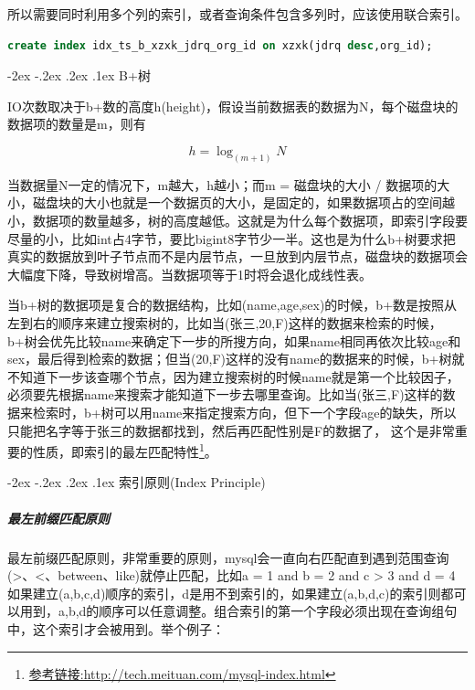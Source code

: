 \documentclass[12pt]{book}
\makeatletter
\numberwithin{dummy}{section}
\theoremstyle{ocrenumbox}
\theoremstyle{blacknumex}
\theoremstyle{blacknumbox}
\theoremstyle{ocrenum}
\renewcommand\paragraph{\@startsection{paragraph}{4}{\z@}
	{-2ex \@plus-.2ex \@minus .2ex}
	{.1ex}
	{\normalfont\small\sffamily\bfseries}}
\makeatother
\begin{document}
所以需要同时利用多个列的索引，或者查询条件包含多列时，应该使用联合索引。

\begin{lstlisting}[language=SQL]
create index idx_ts_b_xzxk_jdrq_org_id on xzxk(jdrq desc,org_id);
\end{lstlisting}

\paragraph{B+树}

IO次数取决于b+数的高度h(height)，假设当前数据表的数据为N，每个磁盘块的数据项的数量是m，则有

\begin{equation}
h=\log_{(m+1)} N
\end{equation}


当数据量N一定的情况下，m越大，h越小；而m = 磁盘块的大小 / 数据项的大小，磁盘块的大小也就是一个数据页的大小，是固定的，如果数据项占的空间越小，数据项的数量越多，树的高度越低。这就是为什么每个数据项，即索引字段要尽量的小，比如int占4字节，要比bigint8字节少一半。这也是为什么b+树要求把真实的数据放到叶子节点而不是内层节点，一旦放到内层节点，磁盘块的数据项会大幅度下降，导致树增高。当数据项等于1时将会退化成线性表。

当b+树的数据项是复合的数据结构，比如(name,age,sex)的时候，b+数是按照从左到右的顺序来建立搜索树的，比如当(张三,20,F)这样的数据来检索的时候，b+树会优先比较name来确定下一步的所搜方向，如果name相同再依次比较age和sex，最后得到检索的数据；但当(20,F)这样的没有name的数据来的时候，b+树就不知道下一步该查哪个节点，因为建立搜索树的时候name就是第一个比较因子，必须要先根据name来搜索才能知道下一步去哪里查询。比如当(张三,F)这样的数据来检索时，b+树可以用name来指定搜索方向，但下一个字段age的缺失，所以只能把名字等于张三的数据都找到，然后再匹配性别是F的数据了， 这个是非常重要的性质，即索引的最左匹配特性\footnote{\url{参考链接:http://tech.meituan.com/mysql-index.html}}。

\paragraph{索引原则(Index Principle)}

\subparagraph{最左前缀匹配原则}

最左前缀匹配原则，非常重要的原则，mysql会一直向右匹配直到遇到范围查询(>、<、between、like)就停止匹配，比如a = 1 and b = 2 and c > 3 and d = 4 如果建立(a,b,c,d)顺序的索引，d是用不到索引的，如果建立(a,b,d,c)的索引则都可以用到，a,b,d的顺序可以任意调整。组合索引的第一个字段必须出现在查询组句中，这个索引才会被用到。举个例子：
\end{document}
